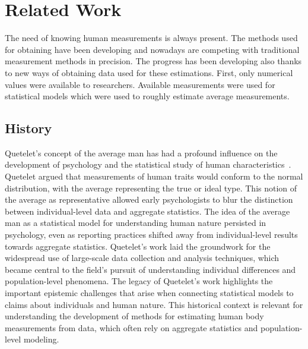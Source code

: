 \chapter{Related Work}
The need of knowing human measurements is always present. The methods used for obtaining have been developing and nowadays are competing with traditional measurement methods in precision. The progress has been developing also thanks to new ways of obtaining data used for these estimations. First, only numerical values were available to researchers. Available measurements were used for statistical models which were used to roughly estimate average measurements.


\section{History}
Quetelet's concept of the average man has had a profound influence on the development of psychology and the statistical study of human characteristics~\cite{adolphe}. Quetelet argued that measurements of human traits would conform to the normal distribution, with the average representing the true or ideal type. This notion of the average as representative allowed early psychologists to blur the distinction between individual-level data and aggregate statistics.
The idea of the average man as a statistical model for understanding human nature persisted in psychology, even as reporting practices shifted away from individual-level results towards aggregate statistics. Quetelet's work laid the groundwork for the widespread use of large-scale data collection and analysis techniques, which became central to the field's pursuit of understanding individual differences and population-level phenomena.
The legacy of Quetelet's work highlights the important epistemic challenges that arise when connecting statistical models to claims about individuals and human nature. This historical context is relevant for understanding the development of methods for estimating human body measurements from data, which often rely on aggregate statistics and population-level modeling.

